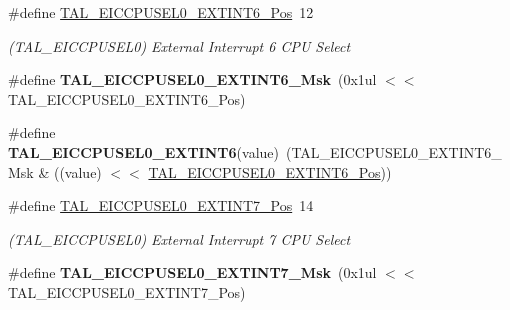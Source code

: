 \begin{DoxyCompactItemize}
\item 
\hypertarget{group___s_a_m_l21___t_a_l_ga4147808f1076c1c952d665e7d2cf38ba}{}\#define \hyperlink{group___s_a_m_l21___t_a_l_ga4147808f1076c1c952d665e7d2cf38ba}{T\+A\+L\+\_\+\+E\+I\+C\+C\+P\+U\+S\+E\+L0\+\_\+\+E\+X\+T\+I\+N\+T6\+\_\+\+Pos}~12\label{group___s_a_m_l21___t_a_l_ga4147808f1076c1c952d665e7d2cf38ba}

\begin{DoxyCompactList}\small\item\em (T\+A\+L\+\_\+\+E\+I\+C\+C\+P\+U\+S\+E\+L0) External Interrupt 6 C\+P\+U Select \end{DoxyCompactList}\item 
\hypertarget{group___s_a_m_l21___t_a_l_ga09503af22be1918cb2881bb8dfd6a581}{}\#define {\bfseries T\+A\+L\+\_\+\+E\+I\+C\+C\+P\+U\+S\+E\+L0\+\_\+\+E\+X\+T\+I\+N\+T6\+\_\+\+Msk}~(0x1ul $<$$<$ T\+A\+L\+\_\+\+E\+I\+C\+C\+P\+U\+S\+E\+L0\+\_\+\+E\+X\+T\+I\+N\+T6\+\_\+\+Pos)\label{group___s_a_m_l21___t_a_l_ga09503af22be1918cb2881bb8dfd6a581}

\item 
\hypertarget{group___s_a_m_l21___t_a_l_gade5cc0244f7a69eeffc323e74aae656f}{}\#define {\bfseries T\+A\+L\+\_\+\+E\+I\+C\+C\+P\+U\+S\+E\+L0\+\_\+\+E\+X\+T\+I\+N\+T6}(value)~(T\+A\+L\+\_\+\+E\+I\+C\+C\+P\+U\+S\+E\+L0\+\_\+\+E\+X\+T\+I\+N\+T6\+\_\+\+Msk \& ((value) $<$$<$ \hyperlink{group___s_a_m_l21___t_a_l_ga4147808f1076c1c952d665e7d2cf38ba}{T\+A\+L\+\_\+\+E\+I\+C\+C\+P\+U\+S\+E\+L0\+\_\+\+E\+X\+T\+I\+N\+T6\+\_\+\+Pos}))\label{group___s_a_m_l21___t_a_l_gade5cc0244f7a69eeffc323e74aae656f}

\item 
\hypertarget{group___s_a_m_l21___t_a_l_gac73545373f2e6ca9a1dcb474fb4a9bad}{}\#define \hyperlink{group___s_a_m_l21___t_a_l_gac73545373f2e6ca9a1dcb474fb4a9bad}{T\+A\+L\+\_\+\+E\+I\+C\+C\+P\+U\+S\+E\+L0\+\_\+\+E\+X\+T\+I\+N\+T7\+\_\+\+Pos}~14\label{group___s_a_m_l21___t_a_l_gac73545373f2e6ca9a1dcb474fb4a9bad}

\begin{DoxyCompactList}\small\item\em (T\+A\+L\+\_\+\+E\+I\+C\+C\+P\+U\+S\+E\+L0) External Interrupt 7 C\+P\+U Select \end{DoxyCompactList}\item 
\hypertarget{group___s_a_m_l21___t_a_l_ga7653585ed468cd331ccad6d047855249}{}\#define {\bfseries T\+A\+L\+\_\+\+E\+I\+C\+C\+P\+U\+S\+E\+L0\+\_\+\+E\+X\+T\+I\+N\+T7\+\_\+\+Msk}~(0x1ul $<$$<$ T\+A\+L\+\_\+\+E\+I\+C\+C\+P\+U\+S\+E\+L0\+\_\+\+E\+X\+T\+I\+N\+T7\+\_\+\+Pos)\label{group___s_a_m_l21___t_a_l_ga7653585ed468cd331ccad6d047855249}


\end{DoxyCompactItemize}
